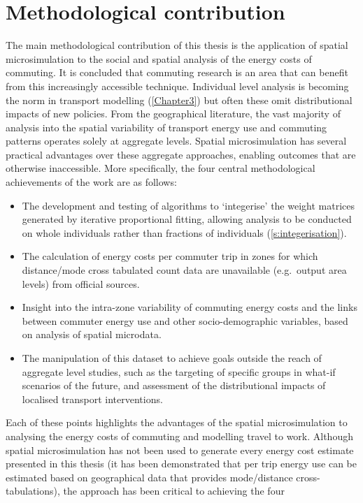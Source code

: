 \documentclass[a4paper, 11pt, twoside]{Thesis}
\begin{document}
\section{Methodological contribution} \label{smethcont}
The main methodological contribution of this thesis is the application of spatial
microsimulation to the social and spatial analysis of the energy costs of commuting.
It is concluded that commuting
research is an area that can benefit from this increasingly accessible
technique. Individual level analysis is becoming the norm in
transport modelling (\cref{Chapter3}) but often these
omit distributional impacts of new policies.
From the geographical literature, the vast majority of analysis into the spatial variability
of transport energy use and commuting patterns operates solely at aggregate levels.
Spatial microsimulation has several practical advantages over these
aggregate approaches, enabling outcomes that are otherwise inaccessible.
More specifically, the four central methodological achievements of the
work are as follows:
\begin{itemize}
 \item The development and testing of algorithms to `integerise' the 
 weight matrices generated by iterative proportional fitting, allowing analysis
 to be conducted on whole individuals rather than fractions of individuals
(\cref{s:integerisation}).
 \item The calculation of energy costs per commuter trip in zones for which
distance/mode cross tabulated count data are unavailable (e.g.~output area levels)
from official sources.
 \item Insight into the intra-zone variability of commuting energy costs and
the links between commuter energy use and other socio-demographic variables,
based on analysis of spatial microdata.
\item The manipulation of this dataset to achieve goals outside the reach of
aggregate level studies, such as the targeting of specific groups in what-if
scenarios of the future, and assessment of the distributional impacts of
localised transport interventions.
\end{itemize}
Each of these points highlights the advantages of the spatial microsimulation
to analysing the energy costs of commuting and modelling travel to work.
Although spatial microsimulation has not been used to generate every energy
cost estimate presented in this thesis (it has been demonstrated that per trip
energy use can be estimated based on geographical data that provides
mode/distance cross-tabulations), the approach has been critical to achieving the four
\end{document}
